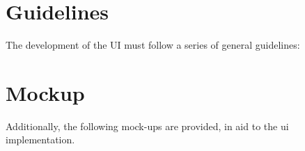 \section{Guidelines}
The development of the UI must follow a series of general guidelines:

\section{Mockup}
Additionally, the following mock-ups are provided, in aid to the ui implementation.

